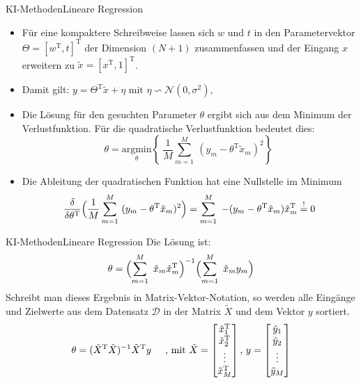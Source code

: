 \documentclass[169, handout	]{THIbeamer} %
\begin{document}
	\begin{frame}{KI-Methoden}{Lineare Regression}
		\footnotesize
		\begin{itemize}			
			\item Für eine kompaktere Schreibweise lassen sich $w$ und $t$ in den Parametervektor $\Theta = [w^{\text{T}}, t]^{\text{T}}$ der Dimension $(N+1)$ zusammenfassen und der Eingang $x$ erweitern zu $ \tilde{x} = [x^{\text{T}}, 1]^{\text{T}}$.
			\item Damit gilt: $
				y = \Theta^{\text{T}} \tilde{x} + \eta \text{ mit } \eta \backsim \mathcal{N}(0, \sigma^2) \text{,} $
			\item Die Lösung für den gesuchten Parameter $\theta$ ergibt sich aus dem Minimum der Verlustfunktion. Für die quadratische Verlustfunktion bedeutet dies:
			\begin{equation}
				\theta = \underset{\theta}{\mathrm{argmin}} \left\{\ \frac{1}{M} \sum_{m=1}^M\ (y_m - \theta^{\text{T}} \tilde{x}_m)^2 \right\}\
			\end{equation}
			\item Die Ableitung der quadratischen Funktion hat eine Nullstelle im Minimum					\begin{equation}
				\frac{\delta}{\delta \theta^{\text{T}}} \Bigl( \frac{1}{M} \sum_{m=1}^M\ (y_m - \theta^{\text{T}} \tilde{x}_m)^2 \Bigr) 
				= \sum_{m=1}^M\ -(y_m - \theta^{\text{T}} \tilde{x}_m) \tilde{x}_m^{\text{T}}
				\stackrel{!}{=} 0 
			\end{equation}

		\end{itemize}
	\end{frame}
	\begin{frame}{KI-Methoden}{Lineare Regression}
		Die Lösung ist:
		\begin{equation}
				\theta = \Bigl( \sum_{m=1}^M\ \tilde{x}_m \tilde{x}_m^{\text{T}} \Bigr)^{-1} \Bigl( \sum_{m=1}^M\ \tilde{x}_m y_m \Bigr)
		\end{equation}
		Schreibt man dieses Ergebnis in Matrix-Vektor-Notation, so werden alle Eingänge und Zielwerte aus dem Datensatz $\mathcal{D}$ in der Matrix $\tilde{X}$ und dem Vektor $y$ sortiert. 
		\begin{equation}
			\theta = ( \tilde{X}^{\text{T}} \tilde{X} )^{-1} \tilde{X}^{\text{T}} y
			\hspace{0.5 cm}	
			\text{, mit }			
			\tilde{X} = 
			\begin{bmatrix}
				\tilde{x}_1^{\text{T}} \\
				\tilde{x}_2^{\text{T}} \\	
				\vdots \\
				\tilde{x}_M^{\text{T}} \\		
			\end{bmatrix}
			\text{,  }
			y =	
			\begin{bmatrix}
				\tilde{y}_1 \\
				\tilde{y}_2 \\	
				\vdots \\
				\tilde{y}_M \\
			\end{bmatrix}						
		\end{equation}
	\end{frame}
	
\end{document}
